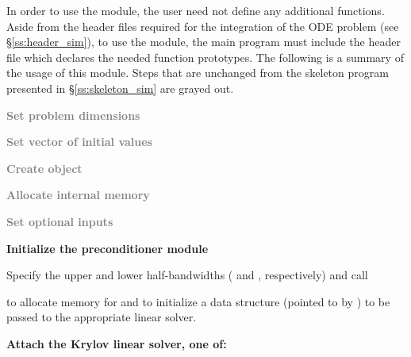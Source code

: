 In order to use the {\cvbandpre} module, the user need not define any
additional functions. 
Aside from the header files required for the integration of the ODE problem
(see \S\ref{ss:header_sim}),  to use the {\cvbandpre} module, the main program 
must include the header file  which declares the needed
function prototypes.
The following is a summary of the usage of this module. Steps that are unchanged from the skeleton
program presented in \S\ref{ss:skeleton_sim} are grayed out.
\begin{Steps}
  
\item
  \textcolor{gray}{\bf Set problem dimensions}

\item
  \textcolor{gray}{\bf Set vector of initial values}
 
\item
  \textcolor{gray}{\bf Create {\cvodes} object}

\item
  \textcolor{gray}{\bf Allocate internal memory}

\item
  \textcolor{gray}{\bf Set optional inputs}

\item \label{i:bandpre_init}
  {\bf Initialize the {\cvbandpre} preconditioner module}

  Specify the upper and lower half-bandwidths ( and , respectively) and call 


  to allocate memory for and to initialize a data structure (pointed to by
  ) to be passed to the appropriate  linear solver.

\item \label{i:bandpre_attach}
  {\bf Attach the Krylov linear solver, one of:}





\end{Steps}
